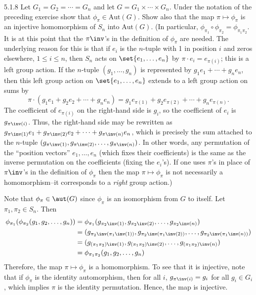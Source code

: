 \begin{exercise}{5.1.8}
    Let $G_1 = G_2 = \cdots = G_n$ and let $G = G_1 \times \cdots \times G_n$.
	Under the notation of the preceding exercise show that $\phi_\pi \in \text{Aut}(G)$.
	Show also that the map $\pi \mapsto \phi_\pi$ is an injective homomorphism of $S_n$ into $\text{Aut}(G)$. (In particular, $\phi_{\pi_1} \circ \phi_{\pi_2} = \phi_{\pi_1 \pi_2}$.
	It is at this point that the $\pi\inv$'s in the definition of $\phi_\pi$ are needed.
	The underlying reason for this is that if $e_i$ is the $n$-tuple with 1 in position $i$ and zeros elsewhere, $1 \leq i \leq n$, then $S_n$ acts on $\set{e_1, \ldots, e_n}$ by $\pi \cdot e_i = e_{\pi(i)}$; this is a left group action.
	If the $n$-tuple $(g_1, \ldots, g_n)$ is represented by $g_1 e_1 + \cdots + g_n e_n$, then this left group action on $\set{e_1, \ldots, e_n}$ extends to a left group action on sums by
    \[
    	\pi \cdot (g_1 e_1 + g_2 e_2 + \cdots + g_n e_n) = g_1 e_{\pi(1)} + g_2 e_{\pi(2)} + \cdots + g_n e_{\pi(n)}.
    \]
    The coefficient of $e_{\pi(i)}$ on the right-hand side is $g_i$, so the coefficient of $e_i$ is $g_{\pi\inv(i)}$.
	Thus, the right-hand side may be rewritten as $g_{\pi\inv(1)} e_1 + g_{\pi\inv(2)} e_2 + \cdots + g_{\pi\inv(n)} e_n$, which is precisely the sum attached to the $n$-tuple $(g_{\pi\inv(1)}, g_{\pi\inv(2)}, \ldots, g_{\pi\inv(n)})$.
	In other words, any permutation of the ``position vectors'' $e_1, \ldots, e_n$ (which fixes their coefficients) is the same as the inverse permutation on the coefficients (fixing the $e_i$'s).
	If one uses $\pi$'s in place of $\pi\inv$'s in the definition of $\phi_\pi$ then the map $\pi \mapsto \phi_\pi$ is not necessarily a homomorphism--it corresponds to a \emph{right} group action.)
\end{exercise}

\begin{sol}
    Note that $\phi_\pi \in \aut(G)$ since $\phi_\pi$ is an isomorphism from $G$ to itself.
	Let $\pi_1, \pi_2 \in S_n$.
	Then
    \begin{align*}
        \phi_{\pi_1}(\phi_{\pi_2}(g_1, g_2, \ldots, g_n)) & = \phi_{\pi_1}(g_{\pi_2\inv(1)}, g_{\pi_2\inv(2)}, \ldots, g_{\pi_2\inv(n)}) \\
        & = (g_{\pi_2\inv(\pi_1\inv(1))}, g_{\pi_2\inv(\pi_1\inv(2))}, \ldots, g_{\pi_2\inv(\pi_1\inv(n))}) \\
        & = (g_{(\pi_1 \pi_2)\inv(1)}, g_{(\pi_1 \pi_2)\inv(2)}, \ldots, g_{(\pi_1 \pi_2)\inv(n)}) \\
        & = \phi_{\pi_1 \pi_2}(g_1, g_2, \ldots, g_n)
    \end{align*}
    Therefore, the map $\pi \mapsto \phi_\pi$ is a homomorphism.
	To see that it is injective, note that if $\phi_\pi$ is the identity automorphism, then for all $i$, $g_{\pi\inv(i)} = g_i$ for all $g_i \in G_i$, which implies $\pi$ is the identity permutation.
	Hence, the map is injective.
\end{sol}

